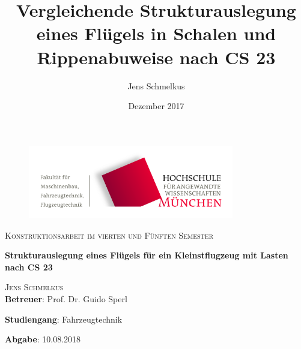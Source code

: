 \begin{titlepage}
\setcounter{page}{1}
\begin{center}
\begin{figure}[h!]
\vspace{0cm}
\centering
\includegraphics[width=0.8\textwidth]{bilder/Logos/FK03_CMYK_Block.png}
\\[0.8cm]
\end{figure}
\vspace{1.5cm}

{\fontsize{20}{60}\scshape Konstruktionsarbeit im vierten und Fünften Semester} 
\\[1.1cm]

\begin{doublespace}
{\fontsize{30}{22}\selectfont \textbf{Strukturauslegung eines Flügels für ein Kleinstflugzeug mit Lasten nach CS 23}\par} 
\vspace{1.4cm}
\end{doublespace}

\title{Vergleichende Strukturauslegung eines Flügels in Schalen und Rippenabuweise nach CS 23}
\author{Jens Schmelkus}
\date{Dezember 2017}

{\fontsize{23}{60}\scshape Jens Schmelkus} 
\\[2.0cm]


\textbf{Betreuer}: Prof. Dr. Guido Sperl




\textbf{Studiengang}: Fahrzeugtechnik 

\textbf{Abgabe}: 10.08.2018

\vfill


\end{center}
\end{titlepage}
